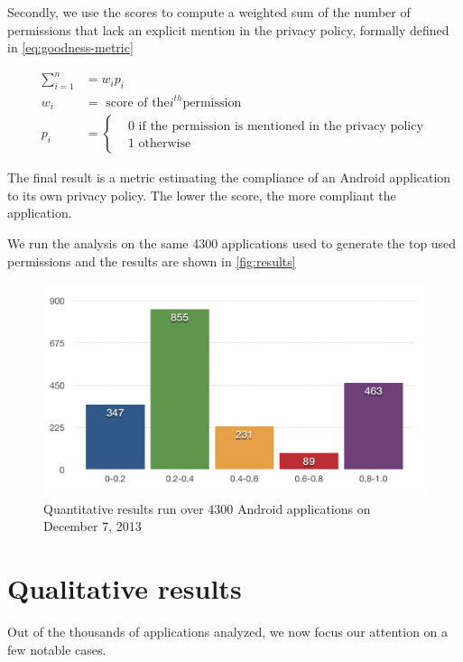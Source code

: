 \documentclass[twoside,letterpaper]{soups}
\theoremstyle{definition}
\begin{document}
Secondly, we use the scores to compute a weighted sum of the number of permissions that lack an explicit mention in the privacy policy, formally defined in \autoref{eq:goodness-metric}

\begin{align}
\label{eq:goodness-metric}
  \sum\limits_{i=1}^n &= w_i p_i \\
  w_i &= \text{ score of the} i^{th} \text{permission} \\
  p_i &=
  \begin{cases}
    & 0 \text{ if the permission is mentioned in the privacy policy} \\
    & 1 \text{ otherwise}
  \end{cases}
\end{align}

The final result is a metric estimating the compliance of an Android application to its own privacy policy. The lower the score, the more compliant the application.

We run the analysis on the same 4300 applications used to generate the top used permissions and the results are shown in \autoref{fig:results}

\begin{figure}[tb]
\centering
     \includegraphics[width=\linewidth]{images/results}
      \caption{Quantitative results run over 4300 Android applications on December 7, 2013}
      \label{fig:results}
\end{figure}

\section{Qualitative results}
\label{sec:qualitative-results}
Out of the thousands of applications analyzed, we now focus our attention on a few notable cases.
\end{document}
